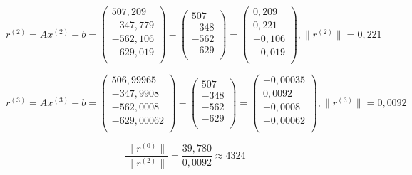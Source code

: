\documentclass[a4paper,12pt]{article} %
\begin{document}
\begin{enumerate}
\begin{equation*}
    r^{(2)} = Ax^{(2)} - b =
    \begin{pmatrix}
        507,209 \\
        -347,779 \\
        -562,106 \\
        -629,019 \\
    \end{pmatrix}
    -
    \begin{pmatrix}
        507 \\
        -348 \\
        -562 \\
        -629 \\
    \end{pmatrix}
    =
    \begin{pmatrix}
        0,209 \\
        0,221 \\
        -0,106 \\
        -0,019 \\
    \end{pmatrix}
    , \|r^{(2)}\| = 0,221
\end{equation*}

\begin{equation*}
    r^{(3)} = Ax^{(3)} - b =
    \begin{pmatrix}
        506,99965 \\
        -347,9908 \\
        -562,0008 \\
        -629,00062 \\
    \end{pmatrix}
    -
    \begin{pmatrix}
        507 \\
        -348 \\
        -562 \\
        -629 \\
    \end{pmatrix}
    =
    \begin{pmatrix}
        -0,00035 \\
        0,0092 \\
        -0,0008 \\
        -0,00062 \\
    \end{pmatrix}
    , \|r^{(3)}\| = 0,0092
\end{equation*}

$$\frac{\|r^{(0)}\|}{\|r^{(2)}\|} = \frac{39,780}{0,0092} \approx 4324$$


\end{enumerate}
\end{document}
